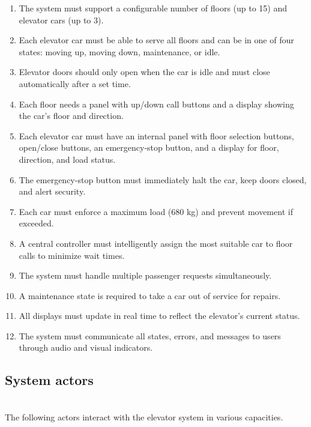 \begin{enumerate}
\item
\protect{}\label{PNi1W8hqo82QEquE0BvgP}
The system must support a configurable number of floors (up to 15) and elevator cars (up to 3).
\item
\protect{}\label{JOxpIBkUCEMCeI5cwwkj5}
Each elevator car must be able to serve all floors and can be in one of four states: moving up, moving down, maintenance, or idle.
\item
\protect{}\label{6xrkkO_IeVdlHluB3yfX0}
Elevator doors should only open when the car is idle and must close automatically after a set time.
\item
\protect{}\label{PtR09RqIIkn3gKPt13P9o}
Each floor needs a panel with up/down call buttons and a display showing the car's floor and direction.
\item
\protect{}\label{TkdaHySEIPBF6l9mvyAm-}
Each elevator car must have an internal panel with floor selection buttons, open/close buttons, an emergency-stop button, and a display for floor, direction, and load status.
\item
\protect{}\label{zIs91Q3bAV5kzBE7N50y3}
The emergency-stop button must immediately halt the car, keep doors closed, and alert security.
\item
\protect{}\label{D3zBVy-1LabweVCNdscHg}
Each car must enforce a maximum load (680 kg) and prevent movement if exceeded.
\item
\protect{}\label{ft2L20_cYifmHJMnLiBif}
A central controller must intelligently assign the most suitable car to floor calls to minimize wait times.
\item
\protect{}\label{4IRiQIrcgbGl62N8hArTL}
The system must handle multiple passenger requests simultaneously.
\item
\protect{}\label{__CSARUYOrMfNlHhwKA5i}
A maintenance state is required to take a car out of service for repairs.
\item
\protect{}\label{qVTub6voWSfvpRzxMNn6W}
All displays must update in real time to reflect the elevator's current status.
\item
\protect{}\label{4qb96vs6HNZ628qcVxvAH}
The system must communicate all states, errors, and messages to users through audio and visual indicators.
\end{enumerate}

\subsection{System actors}\label{7Fmb-YQ0tcLWvy4PPbc56}
\\
The following actors interact with the elevator system in various capacities.

